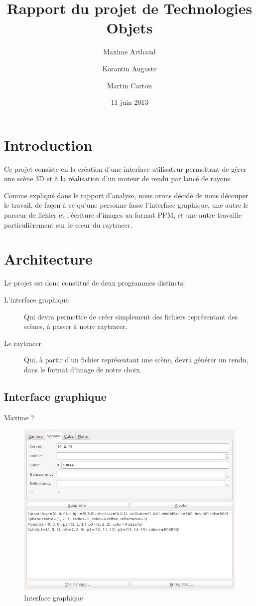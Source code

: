 \documentclass[a4paper]{article}
\title{Rapport du projet de Technologies Objets}
\author{Maxime Arthaud \and Korantin Auguste \and Martin Carton}
\date{11 juin 2013}
\begin{document}
\maketitle

\section{Introduction}
  Ce projet consiste en la création d'une interface utilisateur permettant de
  gérer une scène 3D et à la réalisation d'un moteur de rendu par lancé de
  rayons.

  Comme expliqué dans le rapport d'analyse, nous avons décidé de nous découper
  le travail, de façon à ce qu'une personne fasse l'interface graphique,
  une autre le parseur de fichier et l'écriture d'images au format PPM, et une
  autre travaille particulièrement sur le cœur du raytracer.

\section{Architecture}
  Le projet est donc constitué de deux programmes distincts:
  \begin{description}
      \item[L'interface graphique] Qui devra permettre de créer simplement des
        fichiers représentant des scènes, à passer à notre raytracer.
      \item[Le raytracer] Qui, à partir d'un fichier représentant une scène,
        devra générer un rendu, dans le format d'image de notre choix.
  \end{description}


  \subsection{Interface graphique}
    Maxime ?

    \begin{figure}[p]
      \centerline{\includegraphics[width=1.2\textwidth]{gui.png}}
    \caption{Interface graphique\label{fig:gui}}
    \end{figure}
\end{document}
